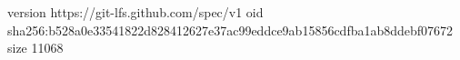 version https://git-lfs.github.com/spec/v1
oid sha256:b528a0e33541822d828412627e37ac99eddce9ab15856cdfba1ab8ddebf07672
size 11068
